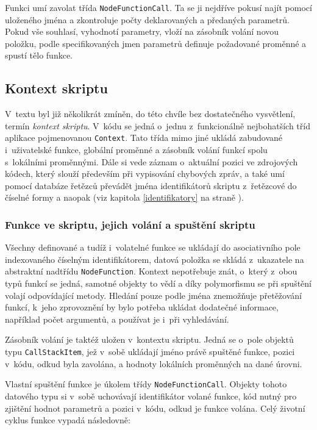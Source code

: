 \documentclass[11pt,twoside,a4paper]{book}
\begin{document}
Funkci umí zavolat třída \texttt{NodeFunctionCall}. Ta se ji nejdříve pokusí najít pomocí uloženého jména a zkontroluje počty deklarovaných a předaných parametrů. Pokud vše souhlasí, vyhodnotí parametry, vloží na zásobník volání novou položku, podle specifikovaných jmen parametrů definuje požadované proměnné a spustí tělo funkce.


\subsection{Kontext skriptu}
\label{kontext_skriptu}

V~textu byl již několikrát zmíněn, do této chvíle bez dostatečného vysvětlení, termín \textit{kontext skriptu}. V~kódu se jedná o~jednu z~funkcionálně nejbohatších tříd aplikace pojmenovanou \texttt{Context}. Tato třída mimo jiné ukládá zabudované i~uživatelské funkce, globální proměnné a zásobník volání funkcí spolu s~lokálními proměnnými. Dále si vede záznam o~aktuální pozici ve zdrojových kódech, který slouží především při vypisování chybových zpráv, a také umí pomocí databáze řetězců převádět jména identifikátorů skriptu z~řetězcové do číselné formy a naopak (viz kapitola \ref{identifikatory} na straně \pageref{identifikatory}).


\subsubsection{Funkce ve skriptu, jejich volání a spuštění skriptu}

Všechny definované a tudíž i~volatelné funkce se ukládají do asociativního pole indexovaného číselným identifikátorem, datová položka se skládá z~ukazatele na abstraktní nadtřídu \texttt{NodeFunction}. Kontext nepotřebuje znát, o~který z~obou typů funkcí se jedná, samotné objekty to vědí a díky polymorfismu se při spuštění volají odpovídající metody. Hledání pouze podle jména znemožňuje přetěžování funkcí, k~jeho zprovoznění by bylo potřeba ukládat dodatečné informace, na\-pří\-klad počet argumentů, a používat je i~při vyhledávání.

Zásobník volání je taktéž uložen v~kontextu skriptu. Jedná se o~pole objektů typu \texttt{Call\-Stack\-Item}, jež v~sobě ukládají jméno právě spuštěné funkce, pozici v~kódu, odkud byla zavolána, a hodnoty lokálních proměnných na dané úrovni.

Vlastní spuštění funkce je úkolem třídy \texttt{NodeFunctionCall}. Objekty tohoto datového typu si v~sobě uchovávají identifikátor volané funkce, kód nutný pro zjištění hodnot parametrů a pozici v~kódu, odkud je funkce volána. Celý životní cyklus funkce vypadá následovně:
\end{document}
